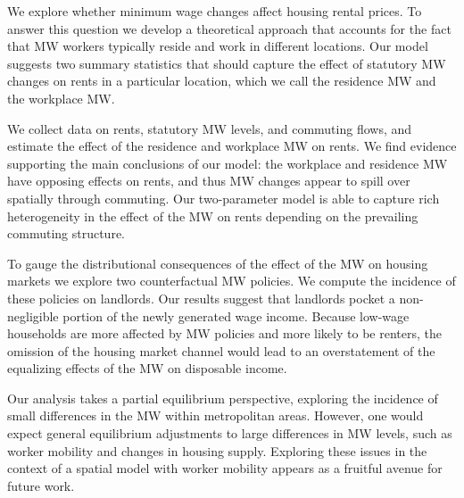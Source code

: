 
We explore whether minimum wage changes affect housing rental prices.
To answer this question we develop a theoretical approach that accounts for
the fact that MW workers typically reside and work in different locations.
Our model suggests two summary statistics that should capture the effect of 
statutory MW changes on rents in a particular location, which we call the 
residence MW and the workplace MW.

We collect data on rents, statutory MW levels, and commuting flows, and estimate 
the effect of the residence and workplace MW on rents.
We find evidence supporting the main conclusions of our model: the workplace and 
residence MW have opposing effects on rents, and thus MW changes appear to 
spill over spatially through commuting.
Our two-parameter model is able to capture rich heterogeneity in the effect 
of the MW on rents depending on the prevailing commuting structure.

To gauge the distributional consequences of the effect of the MW on 
housing markets we explore two counterfactual MW policies.
We compute the incidence of these policies on landlords.
Our results suggest that landlords pocket a non-negligible portion of the newly 
generated wage income.
Because low-wage households are more affected by MW policies and more likely to 
be renters,
the omission of the housing market channel would lead to an overstatement of the 
equalizing effects of the MW on disposable income.

Our analysis takes a partial equilibrium perspective, exploring the incidence 
of small differences in the MW within metropolitan areas.
However, one would expect general equilibrium adjustments to large differences 
in MW levels, such as worker mobility and changes in housing supply.
Exploring these issues in the context of a spatial model with worker mobility 
appears as a fruitful avenue for future work.
